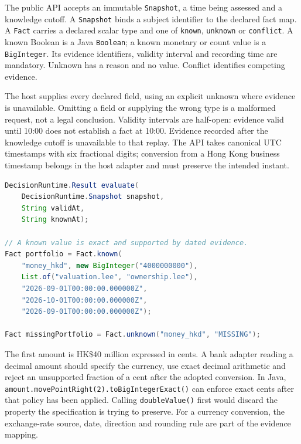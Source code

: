 The public API accepts an immutable \texttt{Snapshot}, a time being assessed and
a knowledge cutoff. A \texttt{Snapshot} binds a subject identifier to the
declared fact map. A \texttt{Fact} carries a declared scalar type and one of
\texttt{known}, \texttt{unknown} or \texttt{conflict}. A known Boolean is a Java
\texttt{Boolean}; a known monetary or count value is a \texttt{BigInteger}.
Its evidence identifiers, validity interval and recording time are mandatory.
Unknown has a reason and no value. Conflict identifies competing evidence.

The host supplies every declared field, using an explicit unknown where evidence
is unavailable. Omitting a field or supplying the wrong type is a malformed
request, not a legal conclusion. Validity intervals are half-open: evidence
valid until 10:00 does not establish a fact at 10:00. Evidence recorded after
the knowledge cutoff is unavailable to that replay. The API takes canonical UTC
timestamps with six fractional digits; conversion from a Hong Kong business
timestamp belongs in the host adapter and must preserve the intended instant.

\begin{lstlisting}[language=Java,caption={The library API and one dated monetary input.}]
DecisionRuntime.Result evaluate(
    DecisionRuntime.Snapshot snapshot,
    String validAt,
    String knownAt);

// A known value is exact and supported by dated evidence.
Fact portfolio = Fact.known(
    "money_hkd", new BigInteger("4000000000"),
    List.of("valuation.lee", "ownership.lee"),
    "2026-09-01T00:00:00.000000Z",
    "2026-10-01T00:00:00.000000Z",
    "2026-09-01T00:00:00.000000Z");

Fact missingPortfolio = Fact.unknown("money_hkd", "MISSING");
\end{lstlisting}
The first amount is HK\$40 million expressed in cents. A bank adapter reading a
decimal amount should specify the currency, use exact decimal arithmetic and
reject an unsupported fraction of a cent after the adopted conversion. In Java,
\texttt{amount.movePointRight(2).toBigIntegerExact()} can enforce exact cents
after that policy has been applied. Calling \texttt{doubleValue()} first would
discard the property the specification is trying to preserve. For a currency
conversion, the exchange-rate source, date, direction and rounding rule are part
of the evidence mapping.

